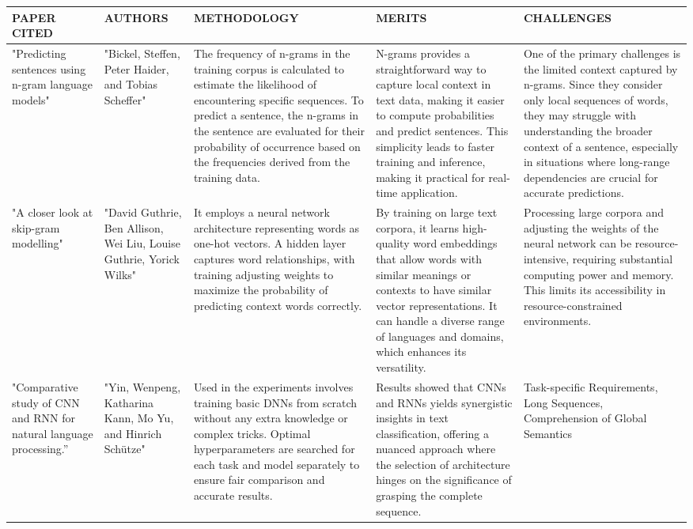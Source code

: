 \documentclass[fleqn,10pt]{thescipub} %
\begin{document}
\begin{table}
\begin{center}
 \centering
   \small %
    \begin{tabular}{ |p{2cm}|p{2cm}|p{3.75cm}|p{3.75cm}|p{3.5cm}| }
\hline
\centering PAPER CITED & \centering  AUTHORS & \centering METHODOLOGY &  \centering MERITS &  \centering CHALLENGES \arraybackslash \\ 
\hline
"Predicting sentences using n-gram language models" &  "Bickel, Steffen, Peter Haider, and Tobias Scheffer" &  The frequency of n-grams in the training corpus is calculated to estimate the likelihood of encountering specific sequences. To predict a sentence, the n-grams in the sentence are evaluated for their probability of occurrence based on the frequencies derived from the training data. &  N-grams provides a straightforward way to capture local context in text data, making it easier to compute probabilities and predict sentences. This simplicity leads to faster training and inference, making it practical for real-time application. &  One of the primary challenges is the limited context captured by n-grams. Since they consider only local sequences of words, they may struggle with understanding the broader context of a sentence, especially in situations where long-range dependencies are crucial for accurate predictions.  \\
\hline
"A closer look at skip-gram modelling"  & "David Guthrie, Ben Allison, Wei Liu, Louise Guthrie, Yorick Wilks" &  It employs a neural network architecture representing words as one-hot vectors. A hidden layer captures word relationships, with training adjusting weights to maximize the probability of predicting context words correctly. &  By training on large text corpora, it learns high-quality word embeddings that allow words with similar meanings or contexts to have similar vector representations. It can handle a diverse range of languages and domains, which enhances its versatility. &  Processing large corpora and adjusting the weights of the neural network can be resource-intensive, requiring substantial computing power and memory. This limits its accessibility in resource-constrained environments.  \\
\hline
"Comparative study of CNN and RNN for natural language processing.”  &  "Yin, Wenpeng, Katharina Kann, Mo Yu, and Hinrich Schütze" &  Used in the experiments involves training basic DNNs from scratch without any extra knowledge or complex tricks. Optimal hyperparameters are searched for each task and model separately to ensure fair comparison and accurate results. &  Results showed that CNNs and RNNs yields synergistic insights in text classification, offering a nuanced approach where the selection of architecture hinges on the significance of grasping the complete sequence. &  Task-specific Requirements, Long Sequences, Comprehension of Global Semantics  \\

\end{tabular}
\end{center}
\end{table}
\end{document}
